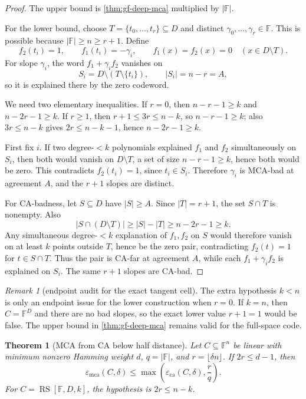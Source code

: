 \documentclass[a4paper,11pt]{amsart}
\newtheorem{theorem}{Theorem}[section]
\theoremstyle{remark}
\newtheorem{remark}[remark]{Remark}
\newcommand{\F}{\mathbb F}
\newcommand{\RS}{\operatorname{RS}}
\newcommand{\emca}{\varepsilon_{\mathrm{mca}}}
\newcommand{\eca}{\varepsilon_{\mathrm{ca}}}
\begin{document}
\begin{proof}
The upper bound is \cref{thm:gf-deep-mca} multiplied by \(|\F|\).

For the lower bound, choose \(T=\{t_0,\ldots,t_r\}\subseteq D\) and distinct \(\gamma_0,\ldots,\gamma_r\in\F\).  This is possible because \(|\F|\ge n\ge r+1\).  Define
\[
        f_2(t_i)=1,\qquad f_1(t_i)=-\gamma_i,
        \qquad
        f_1(x)=f_2(x)=0\quad(x\in D\setminus T).
\]
For slope \(\gamma_i\), the word \(f_1+\gamma_i f_2\) vanishes on
\[
        S_i=D\setminus(T\setminus\{t_i\}),
        \qquad |S_i|=n-r=A,
\]
so it is explained there by the zero codeword.

We need two elementary inequalities.  If \(r=0\), then \(n-r-1\ge k\) and \(n-2r-1\ge k\).  If \(r\ge1\), then \(r+1\le3r\le n-k\), so \(n-r-1\ge k\); also \(3r\le n-k\) gives \(2r\le n-k-1\), hence \(n-2r-1\ge k\).

First fix \(i\).  If two degree-\(<k\) polynomials explained \(f_1\) and \(f_2\) simultaneously on \(S_i\), then both would vanish on \(D\setminus T\), a set of size \(n-r-1\ge k\), hence both would be zero.  This contradicts \(f_2(t_i)=1\), since \(t_i\in S_i\).  Therefore \(\gamma_i\) is MCA-bad at agreement \(A\), and the \(r+1\) slopes are distinct.

For CA-badness, let \(S\subseteq D\) have \(|S|\ge A\).  Since \(|T|=r+1\), the set \(S\cap T\) is nonempty.  Also
\[
        |S\cap(D\setminus T)|\ge |S|-|T|\ge n-2r-1\ge k .
\]
Any simultaneous degree-\(<k\) explanation of \(f_1,f_2\) on \(S\) would therefore vanish on at least \(k\) points outside \(T\), hence be the zero pair, contradicting \(f_2(t)=1\) for \(t\in S\cap T\).  Thus the pair is CA-far at agreement \(A\), while each \(f_1+\gamma_i f_2\) is explained on \(S_i\).  The same \(r+1\) slopes are CA-bad.
\end{proof}

\begin{remark}[endpoint audit for the exact tangent cell]\label{rem:tangent-endpoint-audit}
The extra hypothesis \(k<n\) is only an endpoint issue for the lower construction when \(r=0\).  If \(k=n\), then \(C=\F^D\) and there are no bad slopes, so the exact lower value \(r+1=1\) would be false.  The upper bound in \cref{thm:gf-deep-mca} remains valid for the full-space code.
\end{remark}

\begin{theorem}[MCA from CA below half distance]\label{thm:gf-mca-from-ca}
Let \(C\subseteq\F^n\) be linear with minimum nonzero Hamming weight \(d\), \(q=|\F|\), and \(r=\lfloor\delta n\rfloor\).  If \(2r\le d-1\), then
\[
        \emca(C,\delta)\le \max\!\left(\eca(C,\delta),\frac{r}{q}\right).
\]
For \(C=\RS[\F,D,k]\), the hypothesis is \(2r\le n-k\).
\end{theorem}
\end{document}
